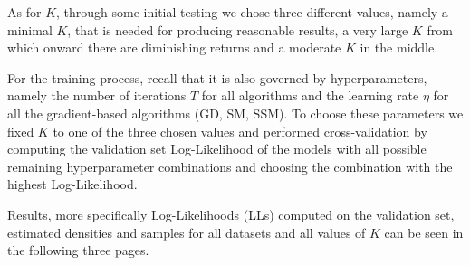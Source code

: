As for $K$, through some initial testing we chose three different values, namely a minimal $K$, that is needed for producing reasonable results, 
a very large $K$ from which onward there are diminishing returns and a moderate $K$ in the middle.

For the training process, recall that it is also governed by hyperparameters, namely the number of iterations $T$ for all algorithms and 
the learning rate $\eta$ for all the gradient-based algorithms (GD, SM, SSM).
To choose these parameters we fixed $K$ to one of the three chosen values and performed cross-validation by computing the validation set Log-Likelihood 
of the models with all possible remaining hyperparameter combinations and choosing the combination with the highest Log-Likelihood.

Results, more specifically Log-Likelihoods (LLs) computed on the validation set, estimated densities and samples for all datasets and all values of $K$ can be seen in the following three pages.  

